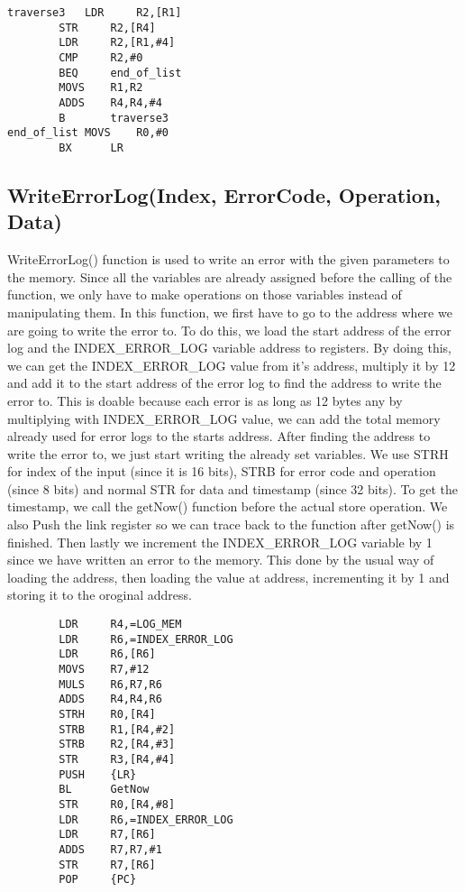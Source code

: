 \documentclass[pdftex,12pt,a4paper]{article}
\begin{document}
\begin{lstlisting}
traverse3	LDR     R2,[R1]					
		STR     R2,[R4]					
		LDR     R2,[R1,#4]					
		CMP     R2,#0						
		BEQ     end_of_list				
		MOVS    R1,R2					
		ADDS    R4,R4,#4					
		B       traverse3
end_of_list	MOVS    R0,#0						
		BX      LR 
\end{lstlisting}




\subsection{WriteErrorLog(Index, ErrorCode, Operation, Data)}

WriteErrorLog() function is used to write an error with the given parameters to the memory. Since all the variables are already assigned before the calling of the function, we only have to make operations on those variables instead of manipulating them. In this function, we first have to go to the address where we are going to write the error to. To do this, we load the start address of the error log and the INDEX\_ERROR\_LOG variable address to registers. By doing this, we can get the INDEX\_ERROR\_LOG value from it's address, multiply it by 12 and add it to the start address of the error log to find the address to write the error to. This is doable because each error is as long as 12 bytes any by multiplying with INDEX\_ERROR\_LOG value, we can add the total memory already used for error logs to the starts address. After finding the address to write the error to, we just start writing the already set variables. We use STRH for index of the input (since it is 16 bits), STRB for error code and operation (since 8 bits) and normal STR for data and timestamp (since 32 bits). To get the timestamp, we call the getNow() function before the actual store operation. We also Push the link register so we can trace back to the function after getNow() is finished. Then lastly we increment the INDEX\_ERROR\_LOG variable by 1 since we have written an error to the memory. This done by the usual way of loading the address, then loading the value at address, incrementing it by 1 and storing it to the oroginal address. 

\begin{lstlisting}
        LDR     R4,=LOG_MEM					
        LDR     R6,=INDEX_ERROR_LOG		
        LDR     R6,[R6]					
        MOVS    R7,#12					
        MULS    R6,R7,R6				
        ADDS    R4,R4,R6					
        STRH    R0,[R4]                    
        STRB    R1,[R4,#2]				
        STRB    R2,[R4,#3]					
        STR     R3,[R4,#4]				
        PUSH    {LR}						
        BL      GetNow						
        STR     R0,[R4,#8]                
        LDR     R6,=INDEX_ERROR_LOG        
        LDR     R7,[R6]                    
        ADDS    R7,R7,#1                   
        STR     R7,[R6]                  
        POP     {PC}                      
\end{lstlisting}
\end{document}
